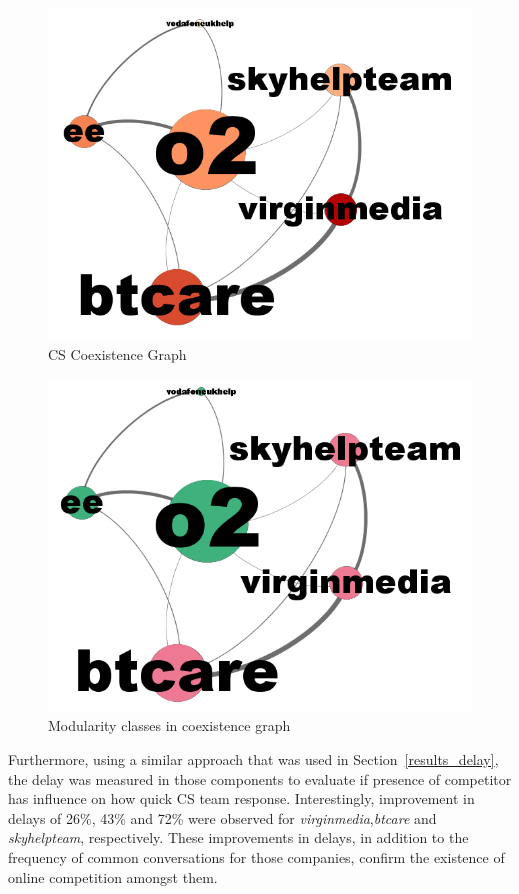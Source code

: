 \documentclass[sigconf]{acmart}
\begin{document}
{\begin{figure}[htb]
\centering
\includegraphics[width=\columnwidth]{images/coexistencegraph.png}
\caption{CS Coexistence Graph}
\label{fig:coexistencegraph}
\end{figure}

\begin{figure}[htb]
\centering
\includegraphics[width=\columnwidth]{images/modularityclassgraph.png}
\caption{Modularity classes in coexistence graph}
\label{fig:modularityclassgraph}
\end{figure}

Furthermore, using a similar approach that was used in
Section~\ref{results_delay}, the delay was measured in those
components to evaluate if presence of competitor has influence on how
quick CS team response. Interestingly, improvement in delays of 26\%, 43\%
and 72\% were observed for {\emph{virginmedia}},{\emph{btcare}} and
{\emph{skyhelpteam}}, respectively. 
These improvements in delays, in addition to
the frequency of common conversations for those companies, 
confirm the existence of online competition amongst them.

}
\end{document}
